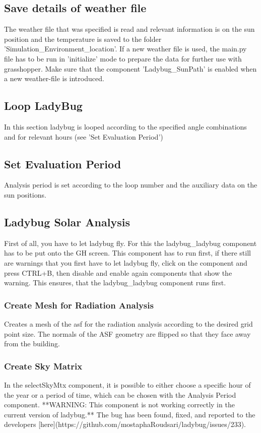 {	\subsection{Save details of weather file}
	The weather file that was specified is read and relevant information is on the sun position and the temperature is saved to the folder 'Simulation_Environment\data\geographical_location'. If a new weather file is used, the main.py file has to be run in 'initialize' mode to prepare the data for further use with grasshopper. Make sure that the component 'Ladybug_SunPath' is enabled when a new weather-file is introduced. 


	\subsection{Loop LadyBug}
	In this section ladybug is looped according to the specified angle combinations and for relevant hours (see 'Set Evaluation Period')


	\subsection{Set Evaluation Period}
	Analysis period is set according to the loop number and the auxiliary data on the sun positions. 

	\subsection{Ladybug Solar Analysis}
	First of all, you have to let ladybug fly. For this the ladybug_ladybug component has to be put onto the GH screen. This component has to run first, if there still are warnings that you first have to let ladybug fly, click on the component and press CTRL+B, then disable and enable again components that show the warning. This ensures, that the ladybug_ladybug component runs first. 

	\subsubsection{Create Mesh for Radiation Analysis}
	Creates a mesh of the asf for the radiation analysis according to the desired grid point size. The normals of the ASF geometry are flipped so that they face away from the building. 

	\subsubsection{Create Sky Matrix}
	In the selectSkyMtx component, it is possible to either choose a specific hour of the year or a period of time, which can be chosen with the Analysis Period component. **WARNING: This component is not working correctly in the current version of ladybug.** The bug has been found, fixed, and reported to the developers [here](https://github.com/mostaphaRoudsari/ladybug/issues/233). 

}
